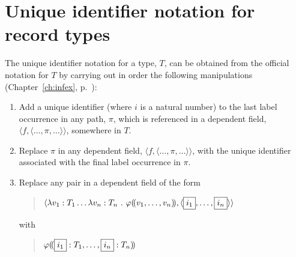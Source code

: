 


\section{Unique identifier notation for record types}
\label{app:unique-id}

The unique identifier notation for a type, $T$, can be obtained from the official
notation for $T$ by carrying out in order the following manipulations
(Chapter~\ref{ch:infex}, p.~\pageref{ex:official-to-unique-id}):
\begin{enumerate} 
 
\item Add a unique identifier  (where $i$ is a natural
  number) to the last label occurrence in any path, $\pi$, which is referenced
  in a dependent field, $\langle f,\langle\ldots,\pi,\ldots\rangle\rangle$, somewhere in $T$. 

\item Replace $\pi$ in any dependent field, $\langle f,\langle\ldots,\pi,\ldots\rangle\rangle$, with the unique identifier
  associated with the final label occurrence in $\pi$.
 
\item Replace any pair in a dependent field of the form 
\begin{quote}
$\langle\lambda v_1:T_1\ldots\lambda v_n:T_n\
.\ \varphi(\!(v_1,\ldots,v_n)\!), \langle \text{\fbox{$i_1$}},\ldots,\text{\fbox{$i_n$}}\rangle\rangle$
\end{quote}
with
\begin{quote}
$\varphi(\!(\text{\fbox{$i_1$}}:T_1,\ldots,\text{\fbox{$i_n$}}:T_n)\!)$
\end{quote}
 
\end{enumerate}


